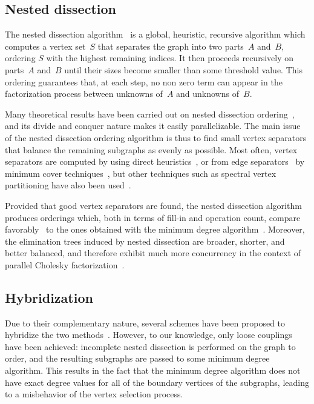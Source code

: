 \subsection{Nested dissection}
\label{sec-algo-nested}

The nested dissection algorithm~\cite{geli81} is a global, heuristic,
recursive algorithm which computes a vertex set~$S$ that separates the
graph into two parts~$A$ and~$B$, ordering $S$ with the highest
remaining indices. It then proceeds recursively on parts~$A$ and~$B$
until their sizes become smaller than some threshold value. This
ordering guarantees that, at each step, no non zero term can appear
in the factorization process between unknowns of~$A$ and unknowns
of~$B$.

Many theoretical results have been carried out on nested dissection
ordering~\cite{chro89,lirota79}, and its divide and conquer nature
makes it easily parallelizable. The main issue of the nested
dissection ordering algorithm is thus to find small vertex separators
that balance the remaining subgraphs as evenly as possible. Most
often, vertex separators are computed by using direct
heuristics~\cite{hero98,lele87}, or from edge separators~\cite[and
included references]{pofa90} by minimum cover
techniques~\cite{duff81,hoka73}, but other techniques such as spectral
vertex partitioning have also been used~\cite{posili90}.

Provided that good vertex separators are found, the nested dissection
algorithm produces orderings which, both in terms of fill-in and
operation count, compare favorably~\cite{gukaku96,kaku95a,pero97a} to
the ones obtained with the minimum degree algorithm~\cite{liu-85}.
Moreover, the elimination trees induced by nested dissection are
broader, shorter, and better balanced, and therefore
exhibit much more concurrency in the context of parallel Cholesky
factorization~\cite[and included
references]{aseilish91,geng89,geheling88,gukaku96,pero97a,shre92}.

\subsection{Hybridization}
\label{sec-algo-nested-hybrid}

Due to their complementary nature, several schemes have been proposed
to hybridize the two methods~\cite{hero98,kaku98a,pero97a}. However,
to our knowledge, only loose couplings have been achieved: incomplete
nested dissection is performed on the graph to order, and the
resulting subgraphs are passed to some minimum degree algorithm. This
results in the fact that the minimum degree algorithm does not have
exact degree values for all of the boundary vertices of the subgraphs,
leading to a misbehavior of the vertex selection process.
\\

